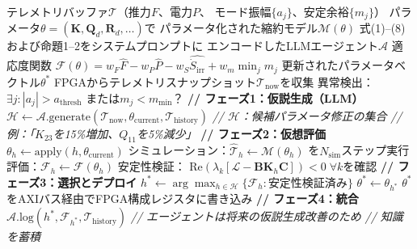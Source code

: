 \documentclass[12pt,twocolumn]{ltjsarticle}
\newcommand{\kk}{\mathbf{K}}
\newcommand{\Lop}{\mathcal{L}}
\newcommand{\Sdot}{\dot{S}_{\mathrm{irr}}}
\begin{document}
\begin{algorithm*}[t]
\caption{自動研究適応ゲイン更新}
\label{alg:autoresearch_gain}
\begin{algorithmic}[1]
\Require テレメトリバッファ$\mathcal{T}$（推力$F$、電力$P$、
  モード振幅$\{a_j\}$、安定余裕$\{m_j\}$）
\Require パラメータ$\theta = (\kk, \mathbf{Q}_d, \mathbf{R}_d, \ldots)$で
  パラメータ化された縮約モデル$\mathcal{M}(\theta)$
\Require 式(1)--(8)および命題1--2をシステムプロンプトに
  エンコードしたLLMエージェント$\mathcal{A}$
\Require 適応度関数
  $\mathcal{F}(\theta) = w_F \hat{F} - w_P \hat{P}
    - w_S \widehat{\Sdot} + w_m \min_j m_j$
\Ensure 更新されたパラメータベクトル$\theta^*$
\Statex
\Loop {}
  \State FPGAからテレメトリスナップショット$\mathcal{T}_{\mathrm{now}}$を収集
  \State 異常検出：$\exists j: |a_j| > a_{\mathrm{thresh}}$
    または$m_j < m_{\mathrm{min}}$？
    \State \textbf{// フェーズ1：仮説生成（LLM）}
    \State $\mathcal{H} \gets \mathcal{A}.\mathrm{generate}(
      \mathcal{T}_{\mathrm{now}}, \theta_{\mathrm{current}},
      \mathcal{T}_{\mathrm{history}})$
    \Statex \quad\quad\textit{// $\mathcal{H}$：候補パラメータ修正の集合}
    \Statex \quad\quad\textit{// 例：「$K_{23}$を15\%増加、$Q_{11}$を5\%減少」}
    \State \textbf{// フェーズ2：仮想評価}
      \State $\theta_h \gets \mathrm{apply}(h, \theta_{\mathrm{current}})$
      \State シミュレーション：$\hat{\mathcal{T}}_h \gets \mathcal{M}(\theta_h)$
        を$N_{\mathrm{sim}}$ステップ実行
      \State 評価：$\mathcal{F}_h \gets \mathcal{F}(\theta_h)$
      \State 安定性検証：
        $\mathrm{Re}(\lambda_k[\Lop - \mathbf{B}\kk_h\mathbf{C}]) < 0
        \;\forall k$を確認
    \EndFor
    \State \textbf{// フェーズ3：選択とデプロイ}
    \State $h^* \gets \arg\max_{h \in \mathcal{H}}
      \{\mathcal{F}_h : \text{安定性検証済み}\}$
    \State $\theta^* \gets \theta_{h^*}$
    \State $\theta^*$をAXIバス経由でFPGA構成レジスタに書き込み
    \State \textbf{// フェーズ4：統合}
    \State $\mathcal{A}.\mathrm{log}(h^*, \mathcal{F}_{h^*},
      \mathcal{T}_{\mathrm{history}})$
    \Statex \quad\quad\textit{// エージェントは将来の仮説生成改善のため}
    \Statex \quad\quad\textit{// 知識を蓄積}
  \EndIf
\EndLoop
\end{algorithmic}
\end{algorithm*}
\end{document}
